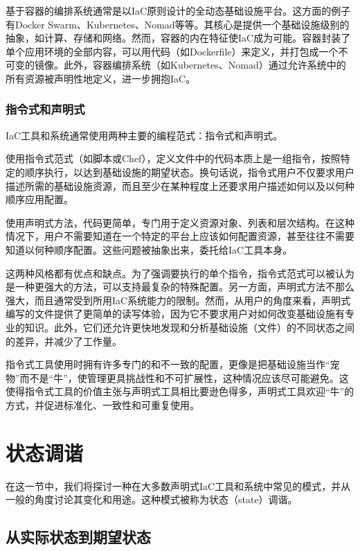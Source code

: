 \documentclass[macfonts,master]{njuthesis}
\begin{document}
基于容器的编排系统通常是以IaC原则设计的全动态基础设施平台。这方面的例子有Docker Swarm、Kubernetes、Nomad等等。其核心是提供一个基础设施级别的抽象，如计算、存储和网络。然而，容器的内在特征使IaC成为可能。容器封装了单个应用环境的全部内容，可以用代码（如Dockerfile）来定义，并打包成一个不可变的镜像。此外，容器编排系统（如Kubernetes、Nomad）通过允许系统中的所有资源被声明性地定义，进一步拥抱IaC。

\subsubsection{指令式和声明式}

IaC工具和系统通常使用两种主要的编程范式：指令式和声明式。

使用指令式范式（如脚本或Chef），定义文件中的代码本质上是一组指令，按照特定的顺序执行，以达到基础设施的期望状态。换句话说，指令式用户不仅要求用户描述所需的基础设施资源，而且至少在某种程度上还要求用户描述如何以及以何种顺序应用配置。

使用声明式方法，代码更简单，专门用于定义资源对象、列表和层次结构。在这种情况下，用户不需要知道在一个特定的平台上应该如何配置资源，甚至往往不需要知道以何种顺序配置。这些问题被抽象出来，委托给IaC工具本身。

这两种风格都有优点和缺点。为了强调要执行的单个指令，指令式范式可以被认为是一种更强大的方法，可以支持最复杂的特殊配置。另一方面，声明式方法不那么强大，而且通常受到所用IaC系统能力的限制。然而，从用户的角度来看，声明式编写的文件提供了更简单的读写体验，因为它不要求用户对如何改变基础设施有专业的知识。此外，它们还允许更快地发现和分析基础设施（文件）的不同状态之间的差异，并减少了工作量。

指令式工具使用时拥有许多专门的和不一致的配置，更像是把基础设施当作``宠物''而不是``牛''，使管理更具挑战性和不可扩展性，这种情况应该尽可能避免。这使得指令式工具的价值主张与声明式工具相比要逊色得多，声明式工具欢迎``牛''的方式，并促进标准化、一致性和可重复使用。

\section{状态调谐}\label{section:reconciliation}

在这一节中，我们将探讨一种在大多数声明式IaC工具和系统中常见的模式，并从一般的角度讨论其变化和用途。这种模式被称为状态（state）调谐。

\subsection{从实际状态到期望状态}
\end{document}
